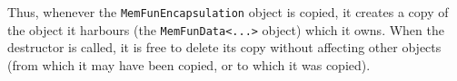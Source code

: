 \documentclass[11pt]{article}
\begin{document}
Thus, whenever the \texttt{MemFunEncapsulation} object is copied, it creates a
copy of the object it harbours (the \texttt{MemFunData<...>} object) which it
owns. When the destructor is called, it is free to delete its copy without
affecting other objects (from which it may have been copied, or to which it
was copied).
\end{document}
